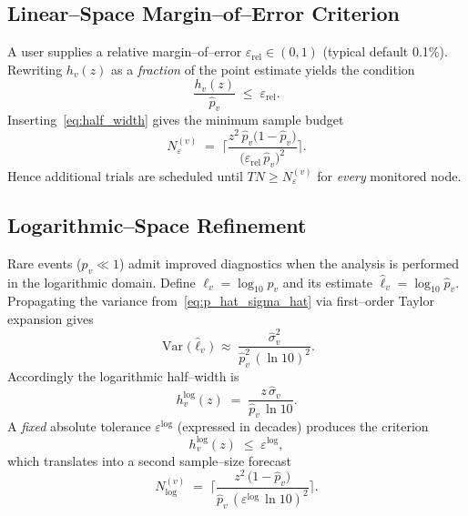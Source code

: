 \subsection{Linear--Space Margin--of--Error Criterion}
\label{subsec:lin_margin}

A user supplies a relative margin--of--error $\varepsilon_{\mathrm{rel}}\!\in\!(0,1)$
(typical default 0.1\%).  Rewriting $h_v(z)$ as a \emph{fraction} of the point
estimate yields the condition
\begin{equation}
  \frac{h_v(z)}{\widehat{p}_v} \;\le\; \varepsilon_{\mathrm{rel}}.
  \label{eq:lin_conv}
\end{equation}
Inserting~\eqref{eq:half_width} gives the minimum sample budget
\begin{equation}
  N_{\varepsilon}^{(v)}
  \;=\;
  \biggl\lceil
    \frac{z^{2}\,\widehat{p}_v\bigl(1-\widehat{p}_v\bigr)}
         {\bigl(\varepsilon_{\mathrm{rel}}\,\widehat{p}_v\bigr)^{2}}
  \biggr\rceil.
  \label{eq:trials_required_lin}
\end{equation}
Hence additional trials are scheduled until $T N\ge N_{\varepsilon}^{(v)}$ for
\emph{every} monitored node.

\subsection{Logarithmic--Space Refinement}
\label{subsec:log_margin}

Rare events ($p_v\ll 1$) admit improved diagnostics when the analysis is
performed in the logarithmic domain.  Define $\ell_v = \log_{10} p_v$ and its
estimate $\widehat{\ell}_v = \log_{10} \widehat{p}_v$.
Propagating the variance from~\eqref{eq:p_hat_sigma_hat} via first--order
Taylor expansion gives
\begin{equation}
  \operatorname{Var}\!\bigl(\widehat{\ell}_v\bigr)
  \;\approx\;
  \frac{\widehat{\sigma}_v^{2}}
       {\widehat{p}_v^{2}\,(\ln 10)^{2}}.
\end{equation}
Accordingly the logarithmic half--width is
\begin{equation}
  h^{\log}_{v}(z)
  \;=\;
  \frac{z\,\widehat{\sigma}_v}{\widehat{p}_v\,\ln 10}.
\end{equation}
A \emph{fixed} absolute tolerance $\varepsilon^{\log}$ (expressed in decades)
produces the criterion
\begin{equation}
  h^{\log}_{v}(z) \;\le\; \varepsilon^{\log},
  \label{eq:log_conv}
\end{equation}
which translates into a second sample--size forecast
\begin{equation}
  N^{(v)}_{\log}
  \;=\;
  \biggl\lceil
    \frac{z^{2}\,\bigl(1-\widehat{p}_v\bigr)}
         {\widehat{p}_v\,(\varepsilon^{\log}\,\ln 10)^{2}}
  \biggr\rceil.
  \label{eq:trials_required_log}
\end{equation}

